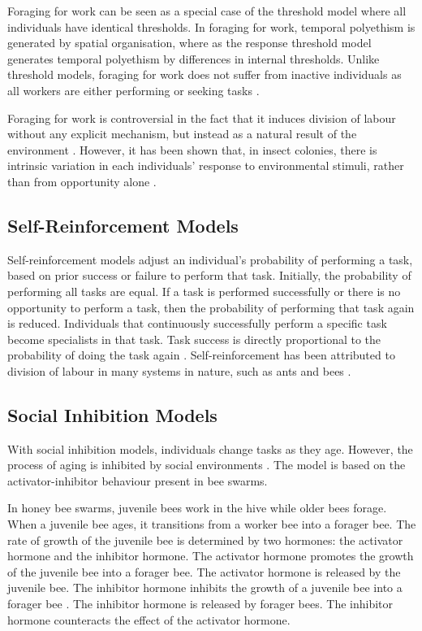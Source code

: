 Foraging for work can be seen as a special case of the threshold model where all individuals have identical thresholds. In foraging for work, temporal polyethism is generated by spatial organisation, where as the response threshold model generates temporal polyethism by differences in internal thresholds. Unlike threshold models, foraging for work does not suffer from inactive individuals as all workers are either performing or seeking tasks \cite{beshers2001models}.

Foraging for work is controversial in the fact that it induces division of labour without any explicit mechanism, but instead as a natural result of the environment \cite{beshers2001models}. However, it has been shown that, in insect colonies, there is intrinsic variation in each individuals' response to environmental  stimuli, rather than from opportunity alone \cite{julian1999undertaking}.

\subsection{Self-Reinforcement Models}
\label{selfreinforcement}

Self-reinforcement models adjust an individual's probability of performing a task, based on prior success or failure to perform that task. Initially, the probability of performing all tasks are equal. If a task is performed successfully or there is  no opportunity to perform a task, then the probability of performing that task again is reduced. Individuals that continuously successfully perform a specific task become specialists in that task. Task success is directly proportional to the probability of doing the task again \cite{theraulaz1998response, pasteels1987individual}. Self-reinforcement has been attributed to division of labour in many systems in nature, such as ants and bees \cite{spencer1998dynamics}.

\subsection{Social Inhibition Models}
\label{socialinhibitionmodels}
With social inhibition models, individuals change tasks as they age. However, the process of aging is inhibited by social environments \cite{huang1992honeybee}. The model is based on the activator-inhibitor behaviour present in bee swarms. 

In honey bee swarms, juvenile bees work in the hive while older bees forage. When a juvenile bee ages, it transitions from a worker bee into a forager bee. The rate of growth of the juvenile bee is determined by two hormones: the activator hormone and the inhibitor hormone. The activator hormone promotes the growth of the juvenile bee into a forager bee. The activator hormone is released by the juvenile bee. The inhibitor hormone inhibits the growth of a juvenile bee into a forager bee \cite{huang1992honeybee}. The inhibitor hormone is released by forager bees. The inhibitor hormone counteracts the effect of the activator hormone.

